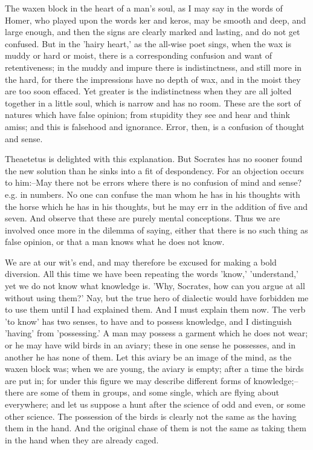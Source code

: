 The waxen block in the heart of a man's soul, as I may say in the words
of Homer, who played upon the words ker and keros, may be smooth and
deep, and large enough, and then the signs are clearly marked and
lasting, and do not get confused. But in the 'hairy heart,' as the
all-wise poet sings, when the wax is muddy or hard or moist, there is
a corresponding confusion and want of retentiveness; in the muddy and
impure there is indistinctness, and still more in the hard, for there
the impressions have no depth of wax, and in the moist they are too
soon effaced. Yet greater is the indistinctness when they are all jolted
together in a little soul, which is narrow and has no room. These are
the sort of natures which have false opinion; from stupidity they see
and hear and think amiss; and this is falsehood and ignorance. Error,
then, is a confusion of thought and sense.

Theaetetus is delighted with this explanation. But Socrates has no
sooner found the new solution than he sinks into a fit of despondency.
For an objection occurs to him:--May there not be errors where there is
no confusion of mind and sense? e.g. in numbers. No one can confuse
the man whom he has in his thoughts with the horse which he has in his
thoughts, but he may err in the addition of five and seven. And observe
that these are purely mental conceptions. Thus we are involved once more
in the dilemma of saying, either that there is no such thing as false
opinion, or that a man knows what he does not know.

We are at our wit's end, and may therefore be excused for making a
bold diversion. All this time we have been repeating the words 'know,'
'understand,' yet we do not know what knowledge is. 'Why, Socrates,
how can you argue at all without using them?' Nay, but the true hero
of dialectic would have forbidden me to use them until I had explained
them. And I must explain them now. The verb 'to know' has two senses,
to have and to possess knowledge, and I distinguish 'having' from
'possessing.' A man may possess a garment which he does not wear; or he
may have wild birds in an aviary; these in one sense he possesses, and
in another he has none of them. Let this aviary be an image of the mind,
as the waxen block was; when we are young, the aviary is empty; after
a time the birds are put in; for under this figure we may describe
different forms of knowledge;--there are some of them in groups, and
some single, which are flying about everywhere; and let us suppose
a hunt after the science of odd and even, or some other science. The
possession of the birds is clearly not the same as the having them in
the hand. And the original chase of them is not the same as taking them
in the hand when they are already caged.

